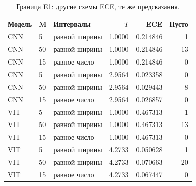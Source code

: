\begin{table}[H]\centering\footnotesize
\setlength{\tabcolsep}{4pt}
\caption{Граница E1: другие схемы ECE, те же предсказания.}\label{tab:binning}
\begin{tabular}{ll lrrr}
\toprule
Модель & M & Интервалы & $T$ & ECE & Пусто \\
\midrule
CNN & 5 & равной ширины & 1.0000 & 0.214846 & 1 \\
CNN & 50 & равной ширины & 1.0000 & 0.214846 & 13 \\
CNN & 15 & равное число & 1.0000 & 0.214846 & 0 \\
CNN & 5 & равной ширины & 2.9564 & 0.023358 & 0 \\
CNN & 50 & равной ширины & 2.9564 & 0.029443 & 8 \\
CNN & 15 & равное число & 2.9564 & 0.026857 & 0 \\
VIT & 5 & равной ширины & 1.0000 & 0.467313 & 1 \\
VIT & 50 & равной ширины & 1.0000 & 0.467313 & 13 \\
VIT & 15 & равное число & 1.0000 & 0.467313 & 0 \\
VIT & 5 & равной ширины & 4.2733 & 0.050628 & 1 \\
VIT & 50 & равной ширины & 4.2733 & 0.070663 & 20 \\
VIT & 15 & равное число & 4.2733 & 0.067447 & 0 \\
\bottomrule
\end{tabular}
\end{table}
